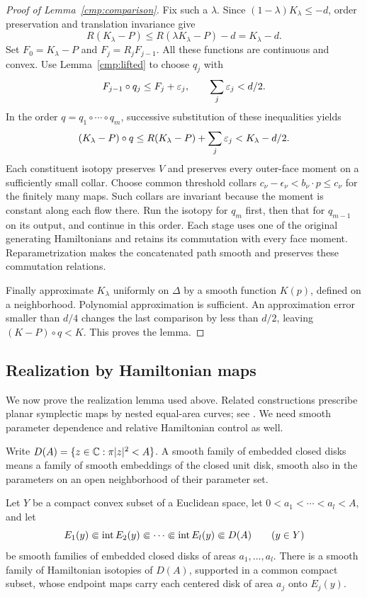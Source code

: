 \begin{proof}[Proof of Lemma~\ref{cmp:comparison}]
Fix such a \(\lambda\). Since
\((1-\lambda)K_\lambda\le-d\), order preservation and
translation invariance give
\begin{equation}\label{cmp:rearranged-gap}
 R(K_\lambda-P)
 \le R(\lambda K_\lambda-P)-d=K_\lambda-d.
\end{equation}
Set \(F_0=K_\lambda-P\) and \(F_j=R_jF_{j-1}\).
All these functions are continuous and convex.
Use Lemma~\ref{cmp:lifted} to choose \(q_j\) with
\[
 F_{j-1}\circ q_j\le F_j+\varepsilon_j,
 \qquad \sum_j\varepsilon_j<d/2.
\]
In the order \(q=q_1\circ\cdots\circ q_m\), successive
substitution of these inequalities yields
\[
 (K_\lambda-P)\circ q
 \le R(K_\lambda-P)+\sum_j\varepsilon_j
 <K_\lambda-d/2.
\]
Each constituent isotopy preserves \(V\) and preserves every
outer-face moment on a sufficiently small collar.
Choose common threshold collars
\(c_\nu-\epsilon_\nu< b_\nu\cdot p\le c_\nu\)
for the finitely many maps.
Such collars are invariant because the moment is constant
along each flow there. Run the isotopy for \(q_m\) first, then that for \(q_{m-1}\)
on its output, and continue in this order. Each stage uses one of
the original generating Hamiltonians and retains its commutation
with every face moment. Reparametrization makes the concatenated
path smooth and preserves these commutation relations.

Finally approximate \(K_\lambda\) uniformly on \(\Delta\) by
a smooth function \(K(p)\), defined on a neighborhood.
Polynomial approximation is sufficient.
An approximation error smaller than \(d/4\) changes the last
comparison by less than \(d/2\), leaving
\((K-P)\circ q<K\). This proves the lemma.
\end{proof}

\subsection{Realization by Hamiltonian maps}

We now prove the realization lemma used above.  Related constructions
prescribe planar symplectic maps by nested equal-area curves;
see \cite[Lemma~3.2]{SchlenkFolding}.  We need smooth parameter
dependence and relative Hamiltonian control as well.

Write \(D(A)=\{z\in\mathbb C:\pi|z|^2<A\}\).
A smooth family of embedded closed disks means a family of smooth
embeddings of the closed unit disk, smooth also in the parameters on
an open neighborhood of their parameter set.

\begin{lemma}\label{cmp:planar-disks}
Let \(Y\) be a compact convex subset of a Euclidean space, let
\(0<a_1<\cdots<a_l<A\), and let
\[
 E_1(y)\Subset\operatorname{int} E_2(y)\Subset\cdots
       \Subset\operatorname{int} E_l(y)\Subset D(A)
 \qquad(y\in Y)
\]
be smooth families of embedded closed disks of areas \(a_1,\ldots,a_l\).
There is a smooth family of Hamiltonian isotopies of \(D(A)\),
supported in a common compact subset, whose endpoint maps carry each
centered disk of area \(a_j\) onto \(E_j(y)\).
\end{lemma}


